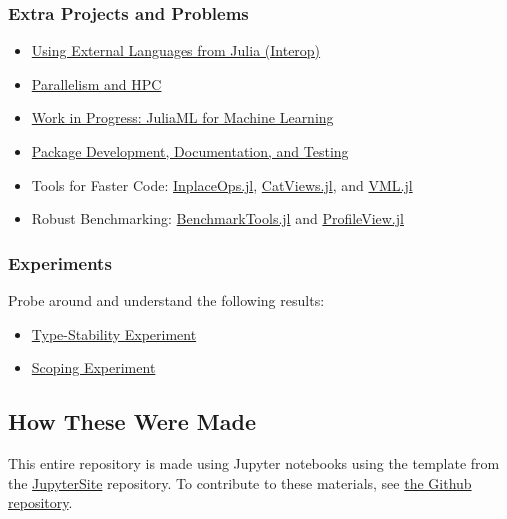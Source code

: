 \documentclass[11pt]{article}
\providecommand{\tightlist}{%
      \setlength{\itemsep}{0pt}\setlength{\parskip}{0pt}}
\begin{document}
\subsubsection{Extra Projects and
Problems}\label{extra-projects-and-problems}

\begin{itemize}
\tightlist
\item
  \href{http://ucidatascienceinitiative.github.io/IntroToJulia/Slides/Interop}{Using
  External Languages from Julia (Interop)}
\item
  \href{http://ucidatascienceinitiative.github.io/IntroToJulia/Slides/HPCJulia}{Parallelism
  and HPC}
\item
  \href{http://ucidatascienceinitiative.github.io/IntroToJulia/Slides/JuliaML}{Work
  in Progress: JuliaML for Machine Learning}
\item
  \href{http://ucidatascienceinitiative.github.io/IntroToJulia/Slides/PackageDevelopment}{Package
  Development, Documentation, and Testing}
\item
  Tools for Faster Code:
  \href{https://github.com/simonbyrne/InplaceOps.jl}{InplaceOps.jl},
  \href{https://github.com/ahwillia/CatViews.jl}{CatViews.jl}, and
  \href{https://github.com/JuliaMath/VML.jl}{VML.jl}
\item
  Robust Benchmarking:
  \href{https://github.com/JuliaCI/BenchmarkTools.jl}{BenchmarkTools.jl}
  and \href{https://github.com/timholy/ProfileView.jl}{ProfileView.jl}
\end{itemize}

\subsubsection{Experiments}\label{experiments}

Probe around and understand the following results:

\begin{itemize}
\tightlist
\item
  \href{http://ucidatascienceinitiative.github.io/IntroToJulia/Slides/TypeStabilityExperiment}{Type-Stability
  Experiment}
\item
  \href{http://ucidatascienceinitiative.github.io/IntroToJulia/Slides/ScopingExperiment}{Scoping
  Experiment}
\end{itemize}

    \subsection{How These Were Made}\label{how-these-were-made}

This entire repository is made using Jupyter notebooks using the
template from the
\href{https://github.com/ChrisRackauckas/JupyterSite}{JupyterSite}
repository. To contribute to these materials, see
\href{https://github.com/UCIDataScienceInitiative/IntroToJulia}{the
Github repository}.


    
    
    
    
\end{document}
